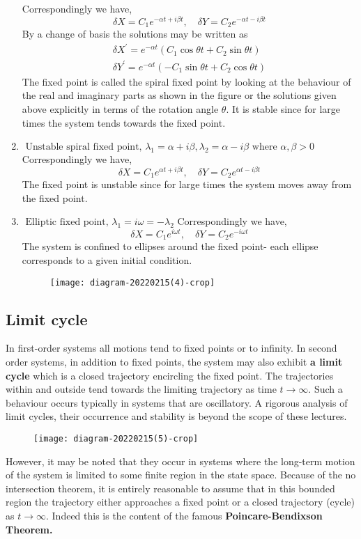 \begin{enumerate}
	Correspondingly we have,
	$$
	\delta X=C_{1} e^{-\alpha t+i \beta t}, \quad \delta Y=C_{2} e^{-\alpha t-i \beta t}
	$$
	By a change of basis the solutions may be written as
	$$
	\begin{gathered}
	\delta X^{\prime}=e^{-\alpha t}\left(C_{1} \cos \theta t+C_{2} \sin \theta t\right) \\
	\delta Y^{\prime}=e^{-\alpha t}\left(-C_{1} \sin \theta t+C_{2} \cos \theta t\right)
	\end{gathered}
	$$
	The fixed point is called the spiral fixed point by looking at the behaviour of the real and imaginary parts as shown in the figure or the solutions given above explicitly in terms of the rotation angle $\theta$. It is stable since for large times the system tends towards the fixed point.
	\item \textbf{$\text { Unstable spiral fixed point, } \lambda_{1}=\alpha+i \beta, \lambda_{2}=\alpha-i \beta \text { where } \alpha, \beta>0 $}
	Correspondingly we have,
	$$
	\delta X=C_{1} e^{\alpha t+i \beta t}, \quad \delta Y=C_{2} e^{\alpha t-i \beta t}
	$$
	The fixed point is unstable since for large times the system moves away from the fixed point.
	\item \textbf{$\text { Elliptic fixed point, } \lambda_{1}=i \omega=-\lambda_{2}$}
 Correspondingly we have,\\
 $$\delta X=C_{1} e^{i \omega t}, \quad \delta Y=C_{2} e^{-i \omega t}$$
 The system is confined to ellipses around the fixed point- each ellipse corresponds to a given initial condition.\\
 \begin{figure}[H]
 	\centering
 	\texttt{[image: diagram-20220215(4)-crop]}
 	\caption{}
 	\label{}
 \end{figure}
\end{enumerate}
\subsection{Limit cycle}
In first-order systems all motions tend to fixed points or to infinity. In second order systems, in addition to fixed points, the system may also exhibit \textbf{a limit cycle} which is a closed trajectory encircling the fixed point. The trajectories within and outside tend towards the limiting trajectory as time $t \rightarrow \infty .$ Such a behaviour occurs typically in systems that are oscillatory. A rigorous analysis of limit cycles, their occurrence and stability is beyond the scope of these lectures.\\
\begin{figure}[H]
	\centering
	\texttt{[image: diagram-20220215(5)-crop]}
	\caption{}
	\label{}
\end{figure}
 However, it may be noted that they occur in systems where the long-term motion of the system is limited to some finite region in the state space. Because of the no intersection theorem, it is entirely reasonable to assume that in this bounded region the trajectory either approaches a fixed point or a closed trajectory (cycle) as $t \rightarrow \infty$. Indeed this is the content of the famous \textbf{Poincare-Bendixson Theorem.}
